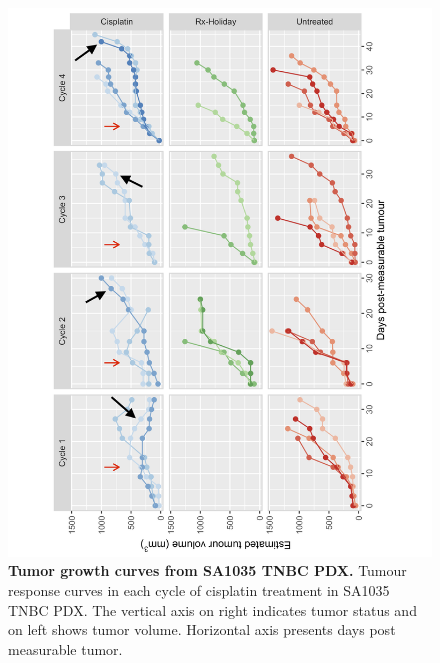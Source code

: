 \begin{figure}
\centering
\includegraphics[width=\textwidth]{Figures/SA1035_AllCyclesCisplatin.png}
	
\caption[Tumor growth curves from SA1035 TNBC PDX]
	{\small
\textbf{Tumor growth curves from SA1035 TNBC PDX.}
Tumour response curves in each cycle of cisplatin treatment in SA1035 TNBC PDX. The vertical axis on right indicates tumor status and on left shows tumor volume. Horizontal axis presents days post measurable tumor.
}
	\label{fig:SA1035_AllCyclesCisplatin}
\end{figure}


